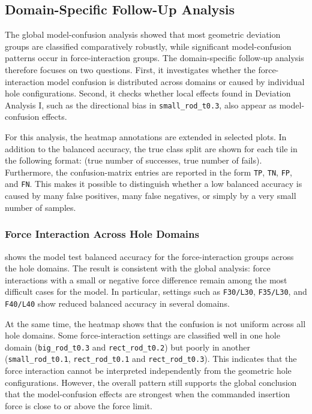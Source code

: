 \subsection{Domain-Specific Follow-Up Analysis}
\label{subsec:da2_domain_specific}

The global model-confusion analysis showed that most geometric deviation groups are classified comparatively robustly, while significant model-confusion patterns occur in force-interaction groups. The domain-specific follow-up analysis therefore focuses on two questions. First, it investigates whether the force-interaction model confusion is distributed across domains or caused by individual hole configurations. Second, it checks whether local effects found in Deviation Analysis I, such as the directional bias in \texttt{small\_rod\_t0.3}, also appear as model-confusion effects.

For this analysis, the heatmap annotations are extended in selected plots. In addition to the balanced accuracy, the true class split are shown for each tile in the following format: (true number of successes, true number of fails). Furthermore, the confusion-matrix entries are reported in the form \texttt{TP}, \texttt{TN}, \texttt{FP}, and \texttt{FN}. This makes it possible to distinguish whether a low balanced accuracy is caused by many false positives, many false negatives, or simply by a very small number of samples.

\subsubsection{Force Interaction Across Hole Domains}
\label{subsubsec:da2_force_interaction_domains}

 shows the model test balanced accuracy for the force-interaction groups across the hole domains. The result is consistent with the global analysis: force interactions with a small or negative force difference remain among the most difficult cases for the model. In particular, settings such as \texttt{F30/L30}, \texttt{F35/L30}, and \texttt{F40/L40} show reduced balanced accuracy in several domains.

At the same time, the heatmap shows that the confusion is not uniform across all hole domains. Some force-interaction settings are classified well in one hole domain (\texttt{big\_rod\_t0.3} and \texttt{rect\_rod\_t0.2}) but poorly in another (\texttt{small\_rod\_t0.1}, \texttt{rect\_rod\_t0.1} and \texttt{rect\_rod\_t0.3}). This indicates that the force interaction cannot be interpreted independently from the geometric hole configurations. However, the overall pattern still supports the global conclusion that the model-confusion effects are strongest when the commanded insertion force is close to or above the force limit.

